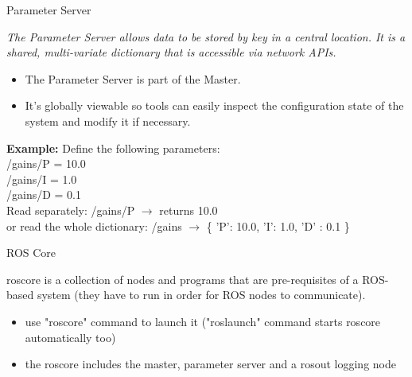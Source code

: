 \documentclass{beamer}
\begin{document}
\begin{frame}{Parameter Server}
	\begin{definition}
		\textit{The Parameter Server allows data to be stored by key in a central location. It is a shared, multi-variate dictionary that is accessible via network APIs.}
	\end{definition}
	
	\begin{itemize}
		\item The Parameter Server is part of the Master.
		\item It's globally viewable so tools can easily inspect the configuration state of the system and modify it if necessary. 
	\end{itemize}
	
	\textbf{Example:} Define the following parameters: \\
	/gains/P = 10.0 \\
	/gains/I = 1.0 \\
	/gains/D = 0.1 \\
	
	Read separately: /gains/P $\rightarrow$ returns  10.0 \\
	or read the whole dictionary: /gains $\rightarrow$ \{ 'P': 10.0, 'I': 1.0, 'D' : 0.1 \}
	
\end{frame}


\begin{frame}{ROS Core}
	\begin{definition}
		roscore is a collection of nodes and programs that are pre-requisites of a ROS-based system (they have to run in order for ROS nodes to communicate).
	\end{definition}
	
	\begin{itemize}
		\item use "roscore" command to launch it ("roslaunch" command starts roscore automatically too)
		\item the roscore includes the master, parameter server and a rosout logging node  
	\end{itemize}	
	
\end{frame}
\end{document}
